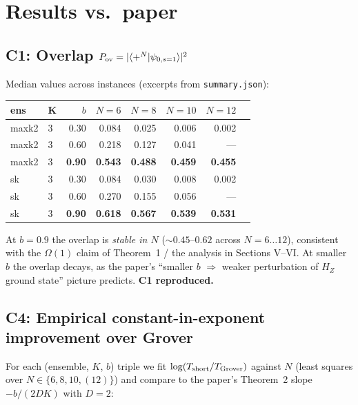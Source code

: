 \documentclass[11pt]{article}
\begin{document}
\section{Results vs.\ paper}

\subsection*{C1: Overlap $P_{\rm ov} = |\langle +^N | \psi_{0,s=1}\rangle|^2$}

Median values across instances (excerpts from \texttt{summary.json}):

\begin{tabular}{llrrrrrr}
\toprule
ens & K & $b$ & $N=6$ & $N=8$ & $N=10$ & $N=12$ \\
\midrule
maxk2 & 3 & 0.30 & 0.084 & 0.025 & 0.006 & 0.002 \\
maxk2 & 3 & 0.60 & 0.218 & 0.127 & 0.041 & --- \\
maxk2 & 3 & \textbf{0.90} & \textbf{0.543} & \textbf{0.488} & \textbf{0.459} & \textbf{0.455} \\
sk    & 3 & 0.30 & 0.084 & 0.030 & 0.008 & 0.002 \\
sk    & 3 & 0.60 & 0.270 & 0.155 & 0.056 & --- \\
sk    & 3 & \textbf{0.90} & \textbf{0.618} & \textbf{0.567} & \textbf{0.539} & \textbf{0.531} \\
\bottomrule
\end{tabular}

At $b=0.9$ the overlap is \emph{stable in $N$} (${\sim}0.45$--$0.62$ across $N=6\ldots 12$), consistent with the $\Omega(1)$ claim of Theorem~1 / the analysis in Sections V--VI. At smaller $b$ the overlap decays, as the paper's ``smaller $b$ $\Rightarrow$ weaker perturbation of $H_Z$ ground state'' picture predicts. \textbf{C1 reproduced.}

\subsection*{C4: Empirical constant-in-exponent improvement over Grover}

For each (ensemble, $K$, $b$) triple we fit $\log(T_{\rm short}/T_{\rm Grover})$ against $N$ (least squares over $N \in \{6,8,10,(12)\}$) and compare to the paper's Theorem~2 slope $-b/(2DK)$ with $D=2$:
\end{document}
